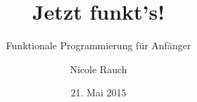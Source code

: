 \documentclass[utf8]{beamer}
\author{Nicole Rauch}
\title{Jetzt funkt's!}
\subtitle{Funktionale Programmierung für Anfänger}
\institute{Softwareentwicklung und Entwicklungscoaching}
\date{21. Mai 2015}
\begin{document}
{
	\begin{frame}[t,plain]
		\titlepage
	\end{frame}
}

\end{document}
